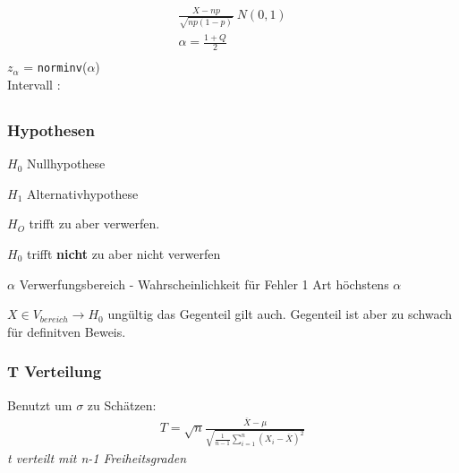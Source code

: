 \documentclass[landscape,twocolumn,a4paper]{article}
\begin{document}
\begin{align}
 \frac{X-np}{\sqrt{np(1-p)}} ~ N(0,1)\\
 \alpha = \frac{1 + Q}{2} \\
\end{align}
$z_{\alpha}$ = \texttt{norminv}($\alpha$)\\
Intervall :\\
\begin{align}
 [\frac{k}{n} - \frac{z_a}{n} \sqrt{\frac{k(n-k)}{n}},\frac{k}{n}+\frac{z_a}{n} \sqrt{\frac{k(n-k)}{n}}]
\end{align}

\subsubsection*{Hypothesen}
\begin{description}
 \item $H_0$ Nullhypothese 
 \item $H_1$ Alternativhypothese
 \item[Fehler 1 Art:] $H_O$ trifft zu aber verwerfen.
 \item[Fehler 2 Art:] $H_0$ trifft \textbf{nicht} zu aber nicht verwerfen
 \item[Signigikanzniveau] $\alpha$ Verwerfungsbereich - Wahrscheinlichkeit für Fehler 1 Art höchstens $\alpha$
 \item $ X \in V_{bereich} \rightarrow H_0$ ungültig das Gegenteil gilt auch. Gegenteil ist aber zu schwach für 
definitven Beweis. 
\end{description}
\subsubsection*{T Verteilung}
Benutzt um $\sigma$ zu Schätzen:
\begin{align}
 T = \sqrt{n} \frac{\overline{X}-\mu}{\sqrt{\frac{1}{n-1} \sum_{i=1}^{n} (X_i-\overline{X})^2}}
\end{align}
\textit{ t verteilt mit n-1 Freiheitsgraden}
\end{document}
